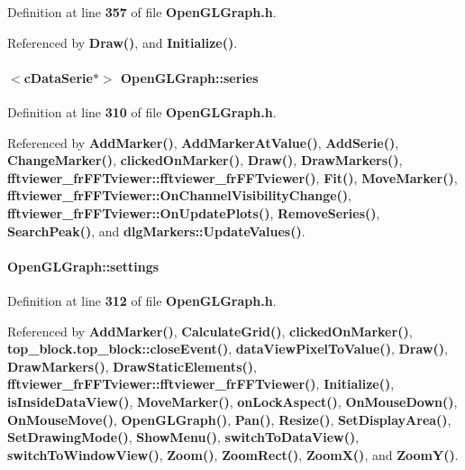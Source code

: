 Definition at line {\bf 357} of file {\bf Open\+G\+L\+Graph.\+h}.



Referenced by {\bf Draw()}, and {\bf Initialize()}.

\paragraph[{series}]{$<${\bf c\+Data\+Serie}$\ast$$>$ Open\+G\+L\+Graph\+::series}\label{classOpenGLGraph_a478d0844d89c9775822d4dff6b0141bc}


Definition at line {\bf 310} of file {\bf Open\+G\+L\+Graph.\+h}.



Referenced by {\bf Add\+Marker()}, {\bf Add\+Marker\+At\+Value()}, {\bf Add\+Serie()}, {\bf Change\+Marker()}, {\bf clicked\+On\+Marker()}, {\bf Draw()}, {\bf Draw\+Markers()}, {\bf fftviewer\+\_\+fr\+F\+F\+Tviewer\+::fftviewer\+\_\+fr\+F\+F\+Tviewer()}, {\bf Fit()}, {\bf Move\+Marker()}, {\bf fftviewer\+\_\+fr\+F\+F\+Tviewer\+::\+On\+Channel\+Visibility\+Change()}, {\bf fftviewer\+\_\+fr\+F\+F\+Tviewer\+::\+On\+Update\+Plots()}, {\bf Remove\+Series()}, {\bf Search\+Peak()}, and {\bf dlg\+Markers\+::\+Update\+Values()}.

\paragraph[{settings}]{ Open\+G\+L\+Graph\+::settings}\label{classOpenGLGraph_aa0a9b97cbdf822431c1589c56b882104}


Definition at line {\bf 312} of file {\bf Open\+G\+L\+Graph.\+h}.



Referenced by {\bf Add\+Marker()}, {\bf Calculate\+Grid()}, {\bf clicked\+On\+Marker()}, {\bf top\+\_\+block.\+top\+\_\+block\+::close\+Event()}, {\bf data\+View\+Pixel\+To\+Value()}, {\bf Draw()}, {\bf Draw\+Markers()}, {\bf Draw\+Static\+Elements()}, {\bf fftviewer\+\_\+fr\+F\+F\+Tviewer\+::fftviewer\+\_\+fr\+F\+F\+Tviewer()}, {\bf Initialize()}, {\bf is\+Inside\+Data\+View()}, {\bf Move\+Marker()}, {\bf on\+Lock\+Aspect()}, {\bf On\+Mouse\+Down()}, {\bf On\+Mouse\+Move()}, {\bf Open\+G\+L\+Graph()}, {\bf Pan()}, {\bf Resize()}, {\bf Set\+Display\+Area()}, {\bf Set\+Drawing\+Mode()}, {\bf Show\+Menu()}, {\bf switch\+To\+Data\+View()}, {\bf switch\+To\+Window\+View()}, {\bf Zoom()}, {\bf Zoom\+Rect()}, {\bf Zoom\+X()}, and {\bf Zoom\+Y()}.

